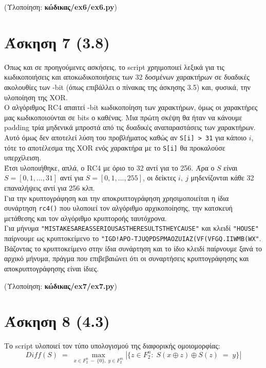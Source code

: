 \documentclass[12pt]{article}
\newcommand{\lt}{\latintext}
\begin{document}
\vspace{0.1in}

\noindent
(Υλοποίηση: \textbf{κώδικας/{\lt ex6/ex6.py}})

\pagebreak

\section*{Άσκηση 7 (3.8)}
\indent
Όπως και σε προηγούμενες ασκήσεις, το {\lt script} χρηιμοποιεί 
λεξικά για τις κωδικοποιήσεις και αποκωδικοποιήσεις των 
32 δοσμένων χαρακτήρων σε δυαδικές ακολουθίες των 
{\lt 5-bit} (όπως επιβάλλει ο πίνακας της άσκησης 3.5) 
και, φυσικά, την υλοποίηση της {\lt XOR}.\\
\indent
Ο αλγόριθμος {\lt RC4} απαιτεί {\lt 8-bit} κωδικοποίηση 
των χαρακτήρων, όμως οι χαρακτήρες μας κωδικοποιούνται σε 
{\lt 5 bits} ο καθένας. Μια πρώτη σκέψη θα ήταν να κάνουμε
{\lt padding} τρία μηδενικά μπροστά από τις δυαδικές 
αναπαραστάσεις των χαρακτήρων. Αυτό όμως δεν αποτελεί 
λύση του προβλήματος καθώς αν \texttt{\lt S[i] > 31} για κάποιο 
$i$, τότε το αποτέλεσμα  της {\lt XOR} ενός χαρακτήρα με το 
\texttt{\lt S[i]} θα προκαλούσε υπερχίλειση. \\
\indent
Έτσι υλοποιήθηκε, απλά, ο {\lt RC4} με όριο το 32 αντί για 
το 256. Άρα ο $S$ είναι $S = [0, 1, ..., 31]$ αντί για 
$S = [0, 1, ..., 255]$, οι δείκτες $i,\:j$ μηδενίζονται κάθε 
32 επαναλήψεις αντί για 256 κλπ. \\
\indent
Για την κρυπτογράφηση και την αποκρυπτογράφηση χρησιμοποιείται 
η ίδια συνάρτηση \texttt{{\lt rc4()}} που υλοποιεί τον 
αλγόριθμο αρχικοποίησης, την κατσκευή μετάθεσης και τον
αλγόριθμο κρυπτοροής ταυτόχρονα.\\ 
\indent
Για μήνυμα 
\texttt{\lt "MISTAKESAREASSERIOUSASTHERESULTSTHEYCAUSE"} και 
κλειδί \texttt{\lt "HOUSE"} παίρνουμε ως κρυπτοκείμενο το 
\texttt{\lt "IGD!APO-TJUQPDSPMAOZUIAZ(VF(VFGQ.IIWMB(WX"}. 
Βάζοντας το κρυπτοκείμενο στην ίδια συνάρτηση και το ίδιο 
κλειδί παίρνουμε ξανά το αρχικό μήνυμα, πράγμα που 
επιβεβαιώνει ότι οι συναρτήσεις κρυπτογράφησης και 
αποκρυπτογράφησης είναι ίδιες. \\


\vspace{0.1in}

\noindent
(Υλοποίηση: \textbf{κώδικας/{\lt ex7/ex7.py}})

\section*{Άσκηση 8 (4.3)}
Το {\lt script} υλοποιεί τον τύπο υπολογισμού της διαφορικής 
ομοιομορφίας:
{\large
\[Diff(S) \;=\; \max_{x \in F_{2}^{n}\:-\:\{0\},\; y \in F_{2}^{m}}
|\{z \in F_{2}^{n}:\; S(x \oplus z) \oplus S(z) \;=\; y\}|
\]
}
\end{document}
